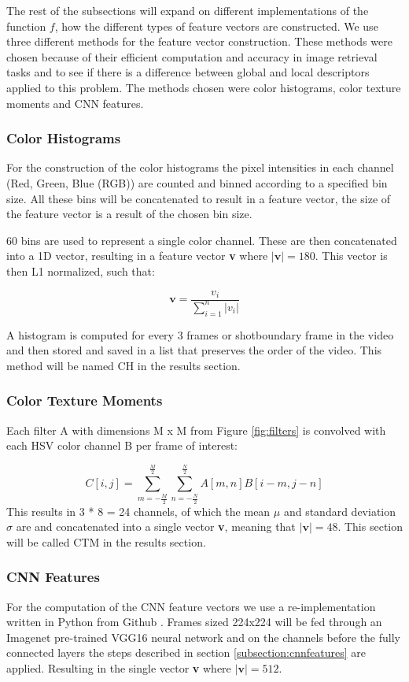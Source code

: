 \documentclass{article}
\begin{document}
The rest of the subsections will expand on different implementations of the function $f$, how the different types of feature vectors are constructed. We use three different methods for the feature vector construction. These methods were chosen because of their efficient computation and accuracy in image retrieval tasks and to see if there is a difference between global and local descriptors applied to this problem. The methods chosen were color histograms, color texture moments and CNN features.

\subsubsection{Color Histograms}
For the construction of the color histograms the pixel intensities in each channel (Red, Green, Blue (RGB)) are counted and binned according to a specified bin size. All these bins will be concatenated to result in a feature vector, the size of the feature vector is a result of the chosen bin size.

60 bins are used to represent a single color channel. These are then concatenated into a 1D vector, resulting in a feature vector \textbf{v} where $|\textbf{v}| = 180$. This vector is then L1 normalized, such that:

\[\textbf{v} = \frac{v_i}{\sum_{i=1}^{n}|v_i|}\]

A histogram is computed for every 3 frames or shotboundary frame in the video and then stored and saved in a list that preserves the order of the video. This method will be named CH in the results section.

\subsubsection{Color Texture Moments}

Each filter A with dimensions M x M from Figure \ref{fig:filters} is convolved with each HSV color channel B per frame of interest:

\[ C[i,j] = \sum_{m=-\frac{M}{2}}^{\frac{M}{2}}\sum_{n=-\frac{N}{2}}^{\frac{N}{2}} A[m, n] B[i-m, j-n] \]
This results in 3 * 8 = 24 channels, of which the mean $\mu$ and standard deviation $\sigma$ are and concatenated into a single vector \textbf{v}, meaning that $|\textbf{v}| = 48$. This section will be called CTM in the results section. 

\subsubsection{CNN Features}
For the computation of the CNN feature vectors we use a re-implementation written in Python from Github \cite{rmac-github}. Frames sized 224x224 will be fed through an Imagenet pre-trained VGG16 neural network and on the channels before the fully connected layers the steps described in section \ref{subsection:cnnfeatures} are applied. Resulting in the single vector \textbf{v} where $|\textbf{v}| = 512$.
\end{document}
